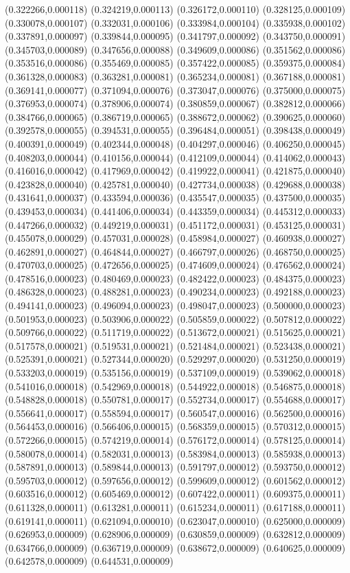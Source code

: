{(0.322266,0.000118) (0.324219,0.000113) (0.326172,0.000110) (0.328125,0.000109) (0.330078,0.000107) (0.332031,0.000106) (0.333984,0.000104) (0.335938,0.000102) (0.337891,0.000097) (0.339844,0.000095) (0.341797,0.000092) (0.343750,0.000091) (0.345703,0.000089) (0.347656,0.000088) (0.349609,0.000086) (0.351562,0.000086) (0.353516,0.000086) (0.355469,0.000085) (0.357422,0.000085) (0.359375,0.000084) (0.361328,0.000083) (0.363281,0.000081) (0.365234,0.000081) (0.367188,0.000081) (0.369141,0.000077) (0.371094,0.000076) (0.373047,0.000076) (0.375000,0.000075) (0.376953,0.000074) (0.378906,0.000074) (0.380859,0.000067) (0.382812,0.000066) (0.384766,0.000065) (0.386719,0.000065) (0.388672,0.000062) (0.390625,0.000060) (0.392578,0.000055) (0.394531,0.000055) (0.396484,0.000051) (0.398438,0.000049) (0.400391,0.000049) (0.402344,0.000048) (0.404297,0.000046) (0.406250,0.000045) (0.408203,0.000044) (0.410156,0.000044) (0.412109,0.000044) (0.414062,0.000043) (0.416016,0.000042) (0.417969,0.000042) (0.419922,0.000041) (0.421875,0.000040) (0.423828,0.000040) (0.425781,0.000040) (0.427734,0.000038) (0.429688,0.000038) (0.431641,0.000037) (0.433594,0.000036) (0.435547,0.000035) (0.437500,0.000035) (0.439453,0.000034) (0.441406,0.000034) (0.443359,0.000034) (0.445312,0.000033) (0.447266,0.000032) (0.449219,0.000031) (0.451172,0.000031) (0.453125,0.000031) (0.455078,0.000029) (0.457031,0.000028) (0.458984,0.000027) (0.460938,0.000027) (0.462891,0.000027) (0.464844,0.000027) (0.466797,0.000026) (0.468750,0.000025) (0.470703,0.000025) (0.472656,0.000025) (0.474609,0.000024) (0.476562,0.000024) (0.478516,0.000023) (0.480469,0.000023) (0.482422,0.000023) (0.484375,0.000023) (0.486328,0.000023) (0.488281,0.000023) (0.490234,0.000023) (0.492188,0.000023) (0.494141,0.000023) (0.496094,0.000023) (0.498047,0.000023) (0.500000,0.000023) (0.501953,0.000023) (0.503906,0.000022) (0.505859,0.000022) (0.507812,0.000022) (0.509766,0.000022) (0.511719,0.000022) (0.513672,0.000021) (0.515625,0.000021) (0.517578,0.000021) (0.519531,0.000021) (0.521484,0.000021) (0.523438,0.000021) (0.525391,0.000021) (0.527344,0.000020) (0.529297,0.000020) (0.531250,0.000019) (0.533203,0.000019) (0.535156,0.000019) (0.537109,0.000019) (0.539062,0.000018) (0.541016,0.000018) (0.542969,0.000018) (0.544922,0.000018) (0.546875,0.000018) (0.548828,0.000018) (0.550781,0.000017) (0.552734,0.000017) (0.554688,0.000017) (0.556641,0.000017) (0.558594,0.000017) (0.560547,0.000016) (0.562500,0.000016) (0.564453,0.000016) (0.566406,0.000015) (0.568359,0.000015) (0.570312,0.000015) (0.572266,0.000015) (0.574219,0.000014) (0.576172,0.000014) (0.578125,0.000014) (0.580078,0.000014) (0.582031,0.000013) (0.583984,0.000013) (0.585938,0.000013) (0.587891,0.000013) (0.589844,0.000013) (0.591797,0.000012) (0.593750,0.000012) (0.595703,0.000012) (0.597656,0.000012) (0.599609,0.000012) (0.601562,0.000012) (0.603516,0.000012) (0.605469,0.000012) (0.607422,0.000011) (0.609375,0.000011) (0.611328,0.000011) (0.613281,0.000011) (0.615234,0.000011) (0.617188,0.000011) (0.619141,0.000011) (0.621094,0.000010) (0.623047,0.000010) (0.625000,0.000009) (0.626953,0.000009) (0.628906,0.000009) (0.630859,0.000009) (0.632812,0.000009) (0.634766,0.000009) (0.636719,0.000009) (0.638672,0.000009) (0.640625,0.000009) (0.642578,0.000009) (0.644531,0.000009) }
